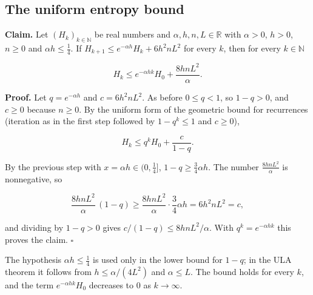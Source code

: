 \documentclass[11pt,a4paper]{report}
\begin{document}
\subsection{\texorpdfstring{The uniform entropy bound}{The uniform entropy bound}}
\label{report-step-UnadjustedLangevin-LSI-DiscreteEntropy-lean-3}


\textbf{Claim.} Let \((H_k)_{k\in\mathbb N}\) be real numbers and \(\alpha,h,n,L\in\mathbb R\) with \(\alpha>0\), \(h>0\), \(n\ge0\) and \(\alpha h\le\frac14\). If \(H_{k+1}\le e^{-\alpha h}H_k+6h^2nL^2\) for every \(k\), then for every \(k\in\mathbb N\)


\[H_k\le e^{-\alpha hk}H_0+\frac{8hnL^2}{\alpha}.\]


\textbf{Proof.} Let \(q=e^{-\alpha h}\) and \(c=6h^2nL^2\). As before \(0\le q<1\), so \(1-q>0\), and \(c\ge0\) because \(n\ge0\). By the uniform form of the geometric bound for recurrences (iteration as in the first step followed by \(1-q^k\le1\) and \(c\ge0\)),


\[H_k\le q^kH_0+\frac{c}{1-q}.\]


By the previous step with \(x=\alpha h\in(0,\frac14]\), \(1-q\ge\frac34\alpha h\). The number \(\frac{8hnL^2}{\alpha}\) is nonnegative, so


\[\frac{8hnL^2}{\alpha}\,(1-q)\ge\frac{8hnL^2}{\alpha}\cdot\frac34\alpha h=6h^2nL^2=c,\]


and dividing by \(1-q>0\) gives \(c/(1-q)\le8hnL^2/\alpha\). With \(q^k=e^{-\alpha hk}\) this proves the claim. \(\square\)




The hypothesis \(\alpha h\le\frac14\) is used only in the lower bound for \(1-q\); in the ULA theorem it follows from \(h\le\alpha/(4L^2)\) and \(\alpha\le L\). The bound holds for every \(k\), and the term \(e^{-\alpha hk}H_0\) decreases to \(0\) as \(k\to\infty\).
\end{document}
